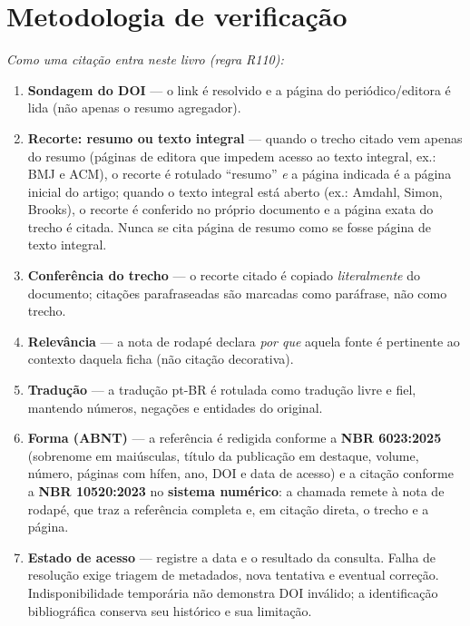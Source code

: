 
\section{Metodologia de verificação}

\begin{metodo}
\emph{Como uma citação entra neste livro (regra R110):}
\begin{enumerate}[leftmargin=1.4em,itemsep=1pt]
  \item \textbf{Sondagem do DOI} — o link  é resolvido
        e a página do periódico/editora é lida (não apenas o resumo agregador).
  \item \textbf{Recorte: resumo ou texto integral} — quando o trecho citado
        vem apenas do resumo (páginas de editora que impedem acesso ao texto
        integral, ex.: BMJ e ACM), o recorte é rotulado ``resumo''
        \emph{e} a página indicada é a página inicial do artigo; quando o
        texto integral está aberto (ex.: Amdahl, Simon, Brooks), o recorte é
        conferido no próprio documento e a página exata do trecho é citada.
        Nunca se cita página de resumo como se fosse página de texto integral.
  \item \textbf{Conferência do trecho} — o recorte citado é copiado
        \emph{literalmente} do documento; citações parafraseadas são marcadas
        como paráfrase, não como trecho.
  \item \textbf{Relevância} — a nota de rodapé declara \emph{por que} aquela
        fonte é pertinente ao contexto daquela ficha (não citação decorativa).
  \item \textbf{Tradução} — a tradução pt-BR é rotulada como tradução livre e
        fiel, mantendo números, negações e entidades do original.
  \item \textbf{Forma (ABNT)} — a referência é redigida conforme a
        \textbf{NBR 6023:2025} (sobrenome em maiúsculas, título da publicação
        em destaque, volume, número, páginas com hífen, ano, DOI e data de
        acesso) e a citação conforme a \textbf{NBR 10520:2023} no
        \textbf{sistema numérico}: a chamada remete à nota de rodapé, que traz
        a referência completa e, em citação direta, o trecho e a página.
  \item \textbf{Estado de acesso} — registre a data e o resultado da consulta.
        Falha de resolução exige triagem de metadados, nova tentativa e eventual
        correção. Indisponibilidade temporária não demonstra DOI inválido; a
        identificação bibliográfica conserva seu histórico e sua limitação.
\end{enumerate}
\end{metodo}

